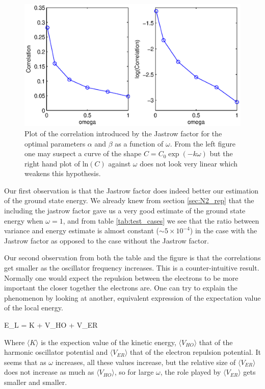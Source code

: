 \begin{figure}[h!]
	\centering 
	\includegraphics[width=\textwidth]{results/correlations_jastrow.eps}
	\caption{Plot of the correlation introduced by the Jastrow factor for the optimal parameters $\alpha$ and $\beta$ as a function of $\omega$. 
	From the left figure one may suspect a curve of the shape $C = C_0 \exp(-k\omega)$ but the right hand plot of $\textrm{ln}(C)$ against $\omega$ does not look very linear which weakens this hypothesis.}
	\label{fig:correlations_jastrow}
\end{figure}

Our first observation is that the Jastrow factor does indeed better our estimation of the ground state energy. 
We already knew from section \ref{sec:N2_rep} that the including the jastrow factor gave us a very good estimate of the ground state energy when $\omega = 1$, and from table \ref{tab:test_cases}  we see that the ratio between variance and energy estimate is almost constant ($\sim 5 \times 10^{-4}$) in the case with the Jastrow factor as opposed to the case without the Jastrow factor. 

Our second observation from both the table and the figure is that the correlations get smaller as the oscillator frequency increases. 
This is a counter-intuitive result.
Normally one would expect the repulsion between the electrons to be more important the closer together the electrons are.
One can try to explain the phenomenon by looking at another, equivalent expression of the expectation value of the local energy.

\eqs
\langle E_L \rangle = \langle K \rangle + \langle V_{HO} \rangle + \langle V_{ER} \rangle 
\eqf

Where $\langle K \rangle$ is the expection value of the kinetic energy, $\langle V_{HO} \rangle$ that of the harmonic oscillator potential and $\langle V_{ER} \rangle$ that of the electron repulsion potential.
It seems that as $\omega$ increases, all these values increase, but the relative size of $\langle V_{ER} \rangle $ does not increase as much as $\langle V_{HO} \rangle$, so for large $\omega$, the role played by $\langle V_{ER} \rangle$ gets smaller and smaller.

